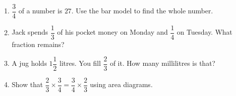 \documentclass{beamer}
\newcommand{\ashow}[1]{\uncover<2->{\textcolor{red}{\small #1}}}
\begin{document}
\begin{frame}
\begin{columns}
\begin{enumerate}
  \item $\dfrac{3}{4}$ of a number is $27$. Use the bar model to find the whole number. \ashow{$36$}

  \item Jack spends $\dfrac{1}{3}$ of his pocket money on Monday and $\dfrac{1}{4}$ on Tuesday. What fraction remains? \ashow{$\dfrac{5}{12}$}

  \item A jug holds $1\dfrac{1}{2}$ litres. You fill $\dfrac{2}{3}$ of it. How many millilitres is that? \ashow{$1000$ mL}

  \item Show that $\dfrac{2}{3} \times \dfrac{3}{4} = \dfrac{3}{4} \times \dfrac{2}{3}$ using area diagrams.


\end{enumerate}
\end{columns}
\end{frame}
\end{document}
